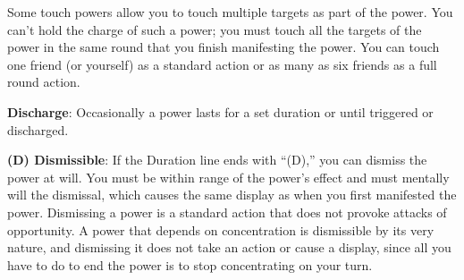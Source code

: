 Some touch powers allow you to touch multiple targets as part of the power. You can't hold the charge of such a power; you must touch all the targets of the power in the same round that you finish manifesting the power. You can touch one friend (or yourself) as a standard action or as many as six friends as a full round action.

\textbf{Discharge}: Occasionally a power lasts for a set duration or until triggered or discharged.

\textbf{(D) Dismissible}: If the Duration line ends with ``(D),'' you can dismiss the power at will. You must be within range of the power's effect and must mentally will the dismissal, which causes the same display as when you first manifested the power. Dismissing a power is a standard action that does not provoke attacks of opportunity. A power that depends on concentration is dismissible by its very nature, and dismissing it does not take an action or cause a display, since all you have to do to end the power is to stop concentrating on your turn.